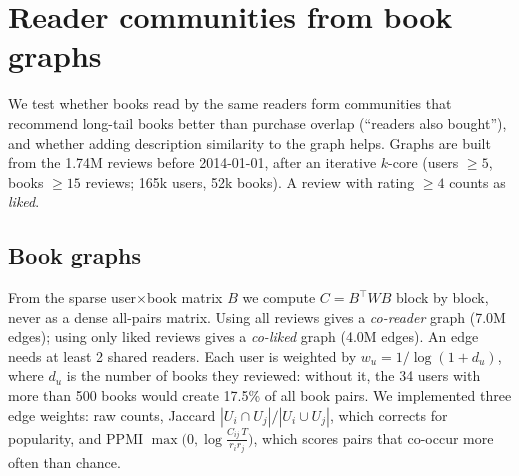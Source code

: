 
\section{Reader communities from book graphs}
\label{sec:graph}

We test whether books read by the same readers form communities that recommend
long-tail books better than purchase overlap (``readers also bought''), and
whether adding description similarity to the graph helps.
Graphs are built from the 1.74M reviews before 2014-01-01, after an iterative
$k$-core (users $\geq 5$, books $\geq 15$ reviews; 165k users, 52k books).
A review with rating $\geq 4$ counts as \emph{liked}.

\subsection{Book graphs}
From the sparse user$\times$book matrix $B$ we compute $C = B^\top W B$ block by
block, never as a dense all-pairs matrix. Using all reviews gives a
\emph{co-reader} graph (7.0M edges); using only liked reviews gives a
\emph{co-liked} graph (4.0M edges). An edge needs at least 2 shared readers.
Each user is weighted by $w_u = 1/\log(1+d_u)$, where $d_u$ is the number of
books they reviewed: without it, the 34 users with more than 500 books would
create 17.5\% of all book pairs. We implemented three edge weights: raw counts,
Jaccard $|U_i \cap U_j| / |U_i \cup U_j|$, which corrects for popularity, and
PPMI $\max\bigl(0, \log \tfrac{C_{ij}\,T}{r_i r_j}\bigr)$, which scores pairs that
co-occur more often than chance.

